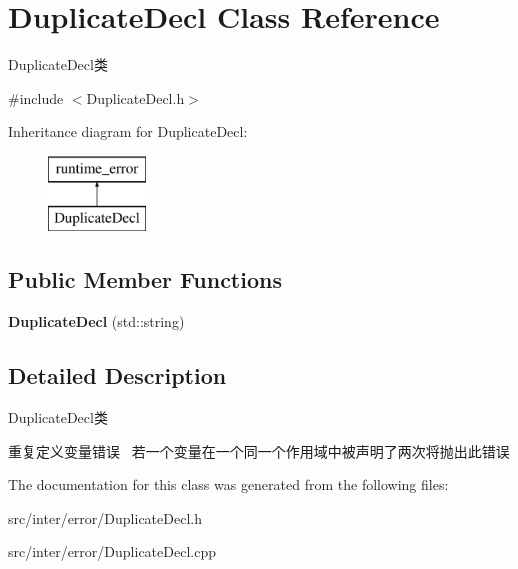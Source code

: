 \hypertarget{class_duplicate_decl}{}\section{Duplicate\+Decl Class Reference}
\label{class_duplicate_decl}


Duplicate\+Decl类  




{\ttfamily \#include $<$Duplicate\+Decl.\+h$>$}

Inheritance diagram for Duplicate\+Decl\+:\begin{figure}[H]
\begin{center}
\leavevmode
\includegraphics[height=2.000000cm]{class_duplicate_decl}
\end{center}
\end{figure}
\subsection*{Public Member Functions}
\begin{DoxyCompactItemize}
\item 
\mbox{\label{class_duplicate_decl_a101a07d46a713363621da69f46a711b3}} 
{\bfseries Duplicate\+Decl} (std\+::string)
\end{DoxyCompactItemize}


\subsection{Detailed Description}
Duplicate\+Decl类 

重复定义变量错误~\newline
若一个变量在一个同一个作用域中被声明了两次将抛出此错误 

The documentation for this class was generated from the following files\+:\begin{DoxyCompactItemize}
\item 
src/inter/error/Duplicate\+Decl.\+h\item 
src/inter/error/Duplicate\+Decl.\+cpp\end{DoxyCompactItemize}

